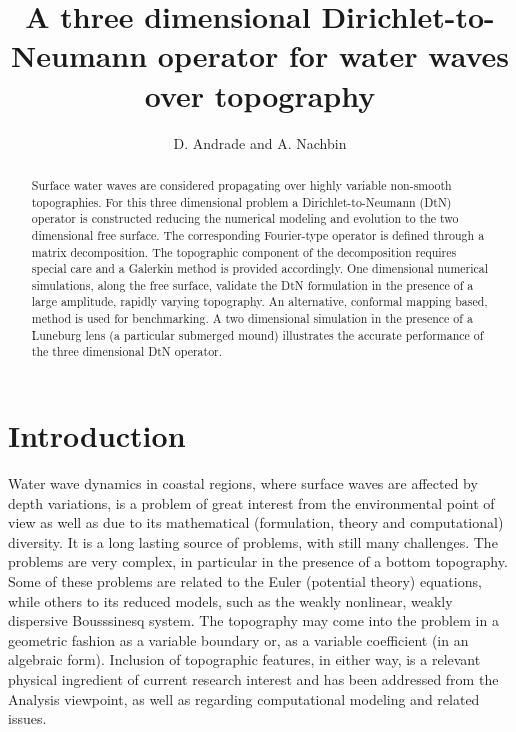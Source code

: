 \documentclass[11pt]{article}
\title{A three dimensional Dirichlet-to-Neumann operator for water waves over topography}
\author{D. Andrade and A. Nachbin}
\date{}
\begin{document}
\maketitle

\begin{abstract}
Surface water waves are considered propagating over highly variable non-smooth topographies. For this  three dimensional 
problem a Dirichlet-to-Neumann (DtN)
operator is constructed  reducing the numerical modeling and evolution to the two dimensional free surface.  The
corresponding Fourier-type operator is defined through a matrix decomposition. The topographic component of the 
decomposition requires special care and a Galerkin method is provided accordingly. One dimensional numerical 
simulations, along the free surface, validate the DtN formulation in the presence of a large amplitude, 
rapidly varying topography.  An alternative, conformal mapping based, method is  used for benchmarking. A two dimensional
simulation in the presence of a Luneburg lens (a particular submerged mound) illustrates the accurate performance of the  
three dimensional DtN operator.
\end{abstract}

\section{Introduction}


Water wave dynamics in coastal regions, where surface waves are affected by depth variations, is a problem of great 
interest from the environmental point of view as well as due to its mathematical (formulation, theory and computational)
diversity. It is a long  lasting source of problems, with still many challenges. 
The problems are very complex, in particular in the presence of a bottom 
topography. Some of these problems are related to the Euler (potential theory) equations, while others to 
its reduced models, such as the weakly nonlinear, weakly dispersive Bousssinesq system. 
The topography may come into the problem 
in a geometric fashion
as a variable boundary or, as a variable coefficient (in an algebraic form).  
Inclusion of  topographic features, in either way, is a relevant physical ingredient of current research interest and has  been
addressed  from  the Analysis viewpoint, as well as regarding 
computational modeling and related issues. 
\end{document}
